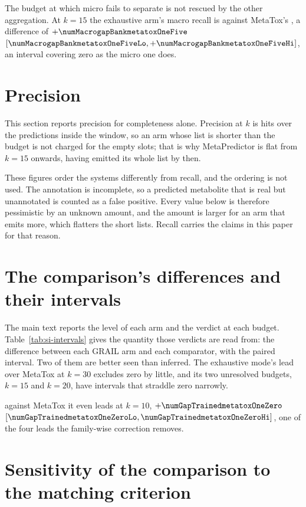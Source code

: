 \documentclass[journal=jcisd8,manuscript=suppinfo,layout=onecolumn]{achemso}
\begin{document}
The budget at which micro fails to separate is not rescued by the other aggregation. At $k=15$ the
exhaustive arm's macro recall is \numMacroBankOneFive{} against MetaTox's
\numMacroMetatoxOneFive{}, a difference of $+\numMacrogapBankmetatoxOneFive$
$[\numMacrogapBankmetatoxOneFiveLo, +\numMacrogapBankmetatoxOneFiveHi]$, an interval covering
zero as the micro one does.

\section{Precision}
\label{sec:si-precision}

This section reports precision for completeness alone.
Precision at $k$ is hits over the predictions inside the window, so an arm whose list is shorter
than the budget is not charged for the empty slots; that is why MetaPredictor is flat from $k=15$
onwards, having emitted its whole list by then.

These figures order the systems differently from recall, and the ordering is not used. The
annotation is incomplete, so a predicted metabolite that is real but unannotated is counted as a
false positive. Every value below is therefore pessimistic by an unknown amount, and the amount is
larger for an arm that emits more, which flatters the short lists. Recall carries the claims in
this paper for that reason.


\section{The comparison's differences and their intervals}
\label{sec:si-intervals}



The main text reports the level of each arm and the verdict at each budget.
Table~\ref{tab:si-intervals}
gives the quantity those verdicts are read from: the difference between each GRAIL arm and each
comparator, with the paired interval. Two of them are better seen than inferred. The
exhaustive mode's lead over MetaTox at $k=30$ excludes zero by little, and its two unresolved
budgets, $k=15$ and $k=20$, have intervals that straddle zero narrowly.


against
MetaTox it even leads at $k=10$, $+\numGapTrainedmetatoxOneZero$
$[\numGapTrainedmetatoxOneZeroLo, \numGapTrainedmetatoxOneZeroHi]$, one of the four leads the
family-wise correction removes.
\section{Sensitivity of the comparison to the matching criterion}
\label{sec:si-sensitivity}
\end{document}
